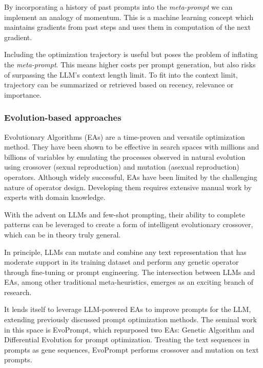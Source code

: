 By incorporating a history of past prompts into the \textit{meta-prompt} we can implement an analogy of momentum. 
This is a machine learning concept which maintains gradients from past steps and uses them in computation of the next gradient.

Including the optimization trajectory is useful but poses the problem of inflating the \textit{meta-prompt}. 
This means higher costs per prompt generation, but also risks of surpassing the LLM's context length limit.
To fit into the context limit, trajectory can be summarized or retrieved based on recency, relevance or importance\cite{tang2024unleashingpotentiallargelanguage}.


\subsubsection{Evolution-based approaches}
Evolutionary Algorithms (EAs) are a time-proven and versatile optimization method. 
They have been shown to be effective in search spaces with millions and billions of variables\cite{meyerson2024languagemodelcrossovervariation}
by emulating the processes observed in natural evolution using crossover (sexual reproduction) and mutation (asexual reproduction) operators.
Although widely successful, EAs have been limited by the challenging nature of operator design.
Developing them requires extensive manual work by experts with domain knowledge\cite{liu2024largelanguagemodelsevolutionary}.

With the advent on LLMs and few-shot prompting, their ability to complete patterns can be leveraged to create a form of intelligent 
evolutionary crossover\cite{meyerson2024languagemodelcrossovervariation}, which can be in theory truly general.

In principle, LLMs can mutate and combine any text representation that has moderate support in its training dataset
and perform any genetic operator through fine-tuning or prompt engineering.
The intersection between LLMs and EAs, among other traditional meta-heuristics, emerges as an exciting branch of research.

It lends itself to leverage LLM-powered EAs to improve prompts for the LLM, extending previously
discussed prompt optimization methods. The seminal work in this space is EvoPrompt\cite{guo2024connectinglargelanguagemodels},
which repurposed two EAs: Genetic Algorithm and Differential Evolution for prompt optimization. 
Treating the text sequences in prompts as gene sequences, EvoPrompt performs crossover and mutation
on text prompts. 

